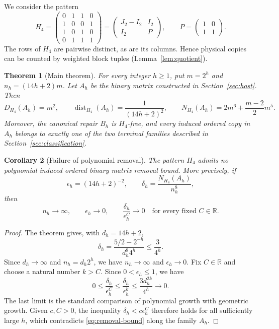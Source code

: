 \documentclass[11pt]{article}
\newtheorem{theorem}{Theorem}[section]
\newtheorem{corollary}[theorem]{Corollary}
\newcommand{\dist}{\operatorname{dist}}
\newcommand{\Copy}{N_{H_4}}
\begin{document}
We consider the pattern
\begin{equation}\label{eq:pattern}
 H_4=\begin{pmatrix}
 0&1&1&0\\
 1&0&0&1\\
 1&0&1&0\\
 0&1&1&1
 \end{pmatrix}
 =\begin{pmatrix}J_2-I_2&I_2\\I_2&P\end{pmatrix},
 \qquad P=\begin{pmatrix}1&0\\1&1\end{pmatrix}.
\end{equation}
The rows of $H_4$ are pairwise distinct, as are its columns. Hence physical
copies can be counted by weighted block tuples (Lemma~\ref{lem:quotient}).

\begin{theorem}[Main theorem]\label{thm:main}
For every integer $h\ge1$, put $m=2^h$ and $n_h=(14h+2)m$. Let $A_h$ be
the binary matrix constructed in Section~\ref{sec:host}. Then
\begin{equation}\label{eq:main}
 D_{H_4}(A_h)=m^2,\qquad
 \dist_{H_4}(A_h)=\frac{1}{(14h+2)^2},\qquad
 \Copy(A_h)=2m^6+\frac{m-2}{2}m^5.
\end{equation}
Moreover, the canonical repair $B_h$ is $H_4$-free, and every induced
ordered copy in $A_h$ belongs to exactly one of the two terminal families
described in Section~\ref{sec:classification}.
\end{theorem}

\begin{corollary}[Failure of polynomial removal]\label{cor:failure}
The pattern $H_4$ admits no polynomial induced ordered binary matrix removal
bound. More precisely, if
\[
 \epsilon_h=(14h+2)^{-2},\qquad
 \delta_h=\frac{\Copy(A_h)}{n_h^8},
\]
then
\[
 n_h\longrightarrow\infty,\qquad \epsilon_h\longrightarrow0,
 \qquad \frac{\delta_h}{\epsilon_h^C}\longrightarrow0
 \quad\text{for every fixed }C\in\mathbb R.
\]
\end{corollary}
\begin{proof}
The theorem gives, with $d_h=14h+2$,
\[
 \delta_h=\frac{5/2-2^{-h}}{d_h^8 4^h}\le\frac{3}{4^h}.
\]
Since $d_h\to\infty$ and $n_h=d_h2^h$, we have $n_h\to\infty$ and
$\epsilon_h\to0$.
Fix $C\in\mathbb R$ and choose a natural number $k>C$. Since
$0<\epsilon_h\le1$, we have
\[
 0\le\frac{\delta_h}{\epsilon_h^C}
 \le\frac{\delta_h}{\epsilon_h^k}
 \le\frac{3d_h^{2k}}{4^h}\longrightarrow0.
\]
The last limit is the standard comparison of polynomial growth with
geometric growth. Given $c,C>0$, the inequality
$\delta_h<c\epsilon_h^C$ therefore holds for all sufficiently large $h$,
which contradicts \eqref{eq:removal-bound} along the family $A_h$.
\end{proof}
\end{document}
